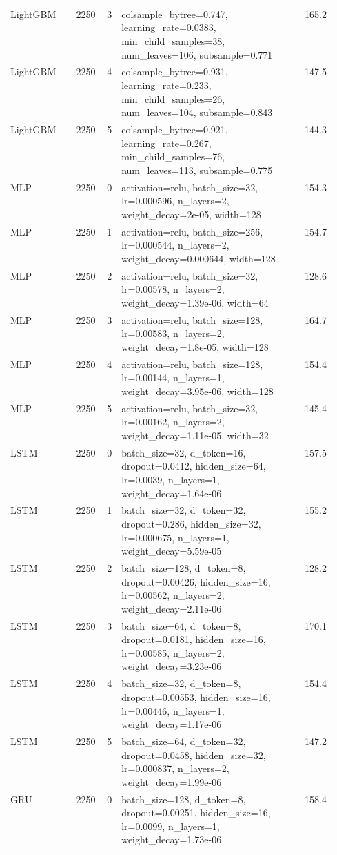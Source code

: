\begin{longtable}{lrrp{0.55\linewidth}r}
LightGBM & 2250 & 3 & colsample\_bytree=0.747, learning\_rate=0.0383, min\_child\_samples=38, num\_leaves=106, subsample=0.771 & 165.2 \\
LightGBM & 2250 & 4 & colsample\_bytree=0.931, learning\_rate=0.233, min\_child\_samples=26, num\_leaves=104, subsample=0.843 & 147.5 \\
LightGBM & 2250 & 5 & colsample\_bytree=0.921, learning\_rate=0.267, min\_child\_samples=76, num\_leaves=113, subsample=0.775 & 144.3 \\
MLP & 2250 & 0 & activation=relu, batch\_size=32, lr=0.000596, n\_layers=2, weight\_decay=2e-05, width=128 & 154.3 \\
MLP & 2250 & 1 & activation=relu, batch\_size=256, lr=0.000544, n\_layers=2, weight\_decay=0.000644, width=128 & 154.7 \\
MLP & 2250 & 2 & activation=relu, batch\_size=32, lr=0.00578, n\_layers=2, weight\_decay=1.39e-06, width=64 & 128.6 \\
MLP & 2250 & 3 & activation=relu, batch\_size=128, lr=0.00583, n\_layers=2, weight\_decay=1.8e-05, width=128 & 164.7 \\
MLP & 2250 & 4 & activation=relu, batch\_size=128, lr=0.00144, n\_layers=1, weight\_decay=3.95e-06, width=128 & 154.4 \\
MLP & 2250 & 5 & activation=relu, batch\_size=32, lr=0.00162, n\_layers=2, weight\_decay=1.11e-05, width=32 & 145.4 \\
LSTM & 2250 & 0 & batch\_size=32, d\_token=16, dropout=0.0412, hidden\_size=64, lr=0.0039, n\_layers=1, weight\_decay=1.64e-06 & 157.5 \\
LSTM & 2250 & 1 & batch\_size=32, d\_token=32, dropout=0.286, hidden\_size=32, lr=0.000675, n\_layers=1, weight\_decay=5.59e-05 & 155.2 \\
LSTM & 2250 & 2 & batch\_size=128, d\_token=8, dropout=0.00426, hidden\_size=16, lr=0.00562, n\_layers=2, weight\_decay=2.11e-06 & 128.2 \\
LSTM & 2250 & 3 & batch\_size=64, d\_token=8, dropout=0.0181, hidden\_size=16, lr=0.00585, n\_layers=2, weight\_decay=3.23e-06 & 170.1 \\
LSTM & 2250 & 4 & batch\_size=32, d\_token=8, dropout=0.00553, hidden\_size=16, lr=0.00446, n\_layers=1, weight\_decay=1.17e-06 & 154.4 \\
LSTM & 2250 & 5 & batch\_size=64, d\_token=32, dropout=0.0458, hidden\_size=32, lr=0.000837, n\_layers=2, weight\_decay=1.99e-06 & 147.2 \\
GRU & 2250 & 0 & batch\_size=128, d\_token=8, dropout=0.00251, hidden\_size=16, lr=0.0099, n\_layers=1, weight\_decay=1.73e-06 & 158.4 \\

\end{longtable}
